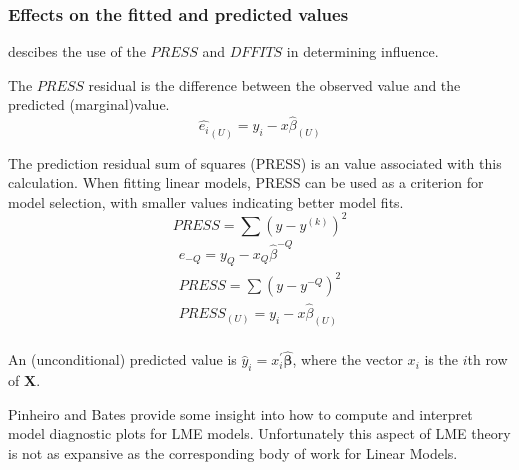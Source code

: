 \documentclass[12pt, a4paper]{report}
\theoremstyle{plain}
\theoremstyle{definition}
\theoremstyle{remark}
\begin{document}

	\subsubsection{Effects on the fitted and predicted values}
	\citet{schabenberger} descibes the use of the $PRESS$ and $DFFITS$ in determining influence.
	
	The $PRESS$ residual is the difference between the observed value and the predicted (marginal)value.
	\begin{equation}
	\hat{e_{i}}_{(U)} = y_{i} - x\hat{\beta}_{(U)}
	\end{equation}
	
	The prediction residual sum of squares (PRESS) is an value associated with this calculation. When fitting linear models, PRESS can be used as a criterion for model selection, with smaller values indicating better model fits.
	\begin{equation}
	PRESS = \sum(y-y^{(k)})^2
	\end{equation}
	\begin{eqnarray*}
		e_{-Q} = y_{Q} - x_{Q}\hat{\beta}^{-Q}\\
		PRESS = \sum(y-y^{-Q})^2\\
		PRESS_{(U)} = y_{i} - x\hat{\beta}_{(U)}\\
	\end{eqnarray*}
	
	
	An (unconditional) predicted value is $\hat{y}_i = x^{\prime}_i \boldsymbol{\hat{\beta}}$, where
	the vector $x_i$ is the $i$th row of $\boldsymbol{X}$.
	
	
	
	
	
	Pinheiro and Bates provide some insight into how to compute and interpret model diagnostic plots for LME models. Unfortunately this aspect of LME theory is not as expansive as the corresponding body of work for Linear Models.
	
\end{document}
